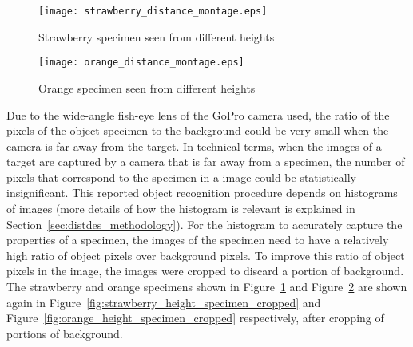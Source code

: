 \begin{figure*}
  \centering
  \begin{subfigure}[]{\textwidth}
      \texttt{[image: strawberry\_distance\_montage.eps]}
      \caption{Strawberry specimen seen from different heights}
      \label{fig:strawberry_height_specimen}
  \end{subfigure}
  \begin{subfigure}[]{\textwidth}
      \texttt{[image: orange\_distance\_montage.eps]}
      \caption{Orange specimen seen from different heights}
      \label{fig:orange_height_specimen}
  \end{subfigure}
\caption[Set of images collected for each specimen from different heights]{A set of 13 images gathered for a specimen (strawberry in () and orange in ()) starting from a height of 32 inches (top left) up to a height of 8 inches (bottom right) away from the target.
Each subsequent image was captured 2 inches closer to the specimen.}
\label{fig:height_specimen}
\end{figure*}	
%
Due to the wide-angle fish-eye lens of the GoPro camera used, the ratio of the pixels of the object specimen to the background could be very small when the camera is far away from the target. In technical terms, when the images of a target are captured by a camera that is far away from a specimen, the number of pixels that correspond to the specimen in a image could be statistically insignificant. This reported object recognition procedure depends on histograms of images (more details of how the histogram is relevant is explained in Section~\ref{sec:distdes_methodology}). 
For the histogram to accurately capture the properties of a specimen, the images of the specimen need to have a relatively high ratio of object pixels over background pixels. To improve this ratio of object pixels in the image, the images were cropped to discard a portion of background. The strawberry and orange specimens shown in Figure~\ref{fig:strawberry_height_specimen} and Figure~\ref{fig:orange_height_specimen} are shown again in Figure~\ref{fig:strawberry_height_specimen_cropped} and 
Figure~\ref{fig:orange_height_specimen_cropped} respectively, after cropping of portions of background.

